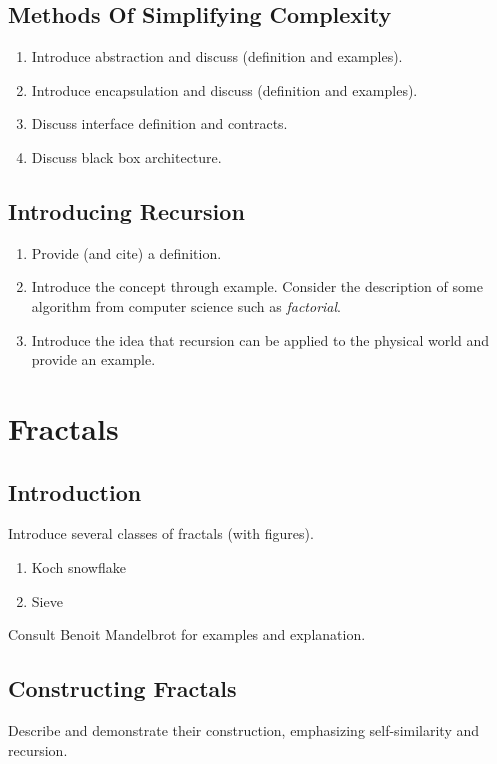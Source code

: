 \documentclass[jou,apacite]{apa6}
\begin{document}
\subsection{Methods Of Simplifying Complexity}  %
\begin{enumerate}
  \item Introduce abstraction and discuss (definition and examples).
  \item Introduce encapsulation and discuss (definition and examples).
  \item Discuss interface definition and contracts.
  \item Discuss black box architecture.
\end{enumerate}

\subsection{Introducing Recursion}  %
\begin{enumerate}
  \item Provide (and cite) a definition.
  \item Introduce the concept through example.  Consider the description of some algorithm from computer science such as \emph{factorial}.
  \item Introduce the idea that recursion can be applied to the physical world and provide an example.
\end{enumerate}

\section{Fractals}  %
\subsection{Introduction}
Introduce several classes of fractals (with figures).
\begin{enumerate}
  \item Koch snowflake
  \item Sieve 
\end{enumerate}
Consult Benoit Mandelbrot for examples and explanation.

\subsection{Constructing Fractals}
Describe and demonstrate their construction, emphasizing self-similarity and recursion.
\end{document}
